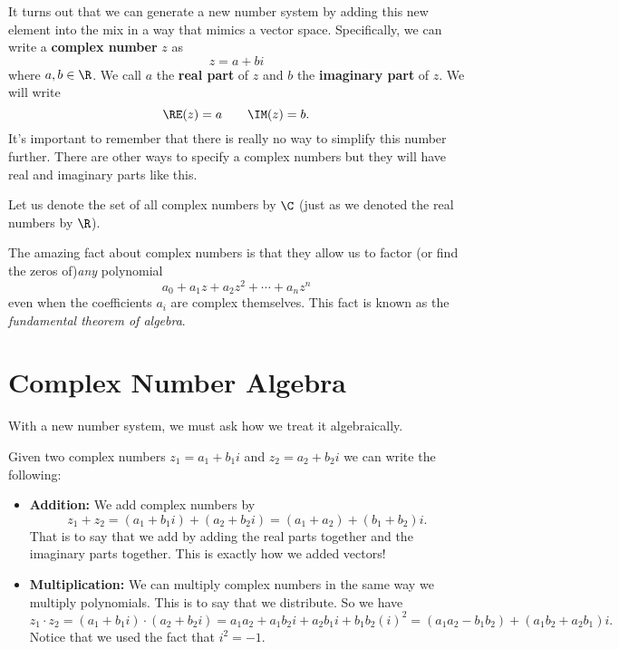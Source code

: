         It turns out that we can generate a new number system by adding this new element into the mix in a way that mimics a vector space.  Specifically, we can write a \textbf{complex number} $z$ as
        \[
        z=a+bi
        \]
        where $a,b\in \R$.  We call $a$ the \textbf{real part} of $z$ and $b$ the \textbf{imaginary part} of $z$.  We will write
        \[
        \RE(z)=a \qquad \IM(z)=b.
        \]
        It's important to remember that there is really no way to simplify this number further. There are other ways to specify a complex numbers but they will have real and imaginary parts like this.
        
        Let us denote the set of all complex numbers by $\C$ (just as we denoted the real numbers by $\R$). 
        
        The amazing fact about complex numbers is that they allow us to factor (or find the zeros of)\emph{any} polynomial
        \[
        a_0+a_1 z + a_2 z^2 + \cdots + a_n z^n
        \]
        even when the coefficients $a_i$ are complex themselves.  This fact is known as the \emph{fundamental theorem of algebra}. 
        
        \section{Complex Number Algebra}
        
        With a new number system, we must ask how we treat it algebraically.  
        
        Given two complex numbers $z_1=a_1+b_1i$ and $z_2=a_2+b_2i$ we can write the following:
        \begin{itemize} 
            \item \textbf{Addition:} We add complex numbers by
            \[
            z_1+z_2=(a_1+b_1i)+(a_2+b_2i)=(a_1+a_2)+(b_1+b_2)i.
            \]
            That is to say that we add by adding the real parts together and the imaginary parts together.  This is exactly how we added vectors!
            
            \item \textbf{Multiplication:} We can multiply complex numbers in the same way we multiply polynomials.  This is to say that we distribute.  So we have
            \[
            z_1\cdot z_2 = (a_1+b_1i)\cdot (a_2+b_2i)= a_1a_2+a_1b_2i+a_2b_1i+b_1b_2(i)^2=(a_1a_2-b_1b_2)+(a_1b_2+a_2b_1)i.
            \]
            Notice that we used the fact that $i^2=-1$.
        \end{itemize}
        
